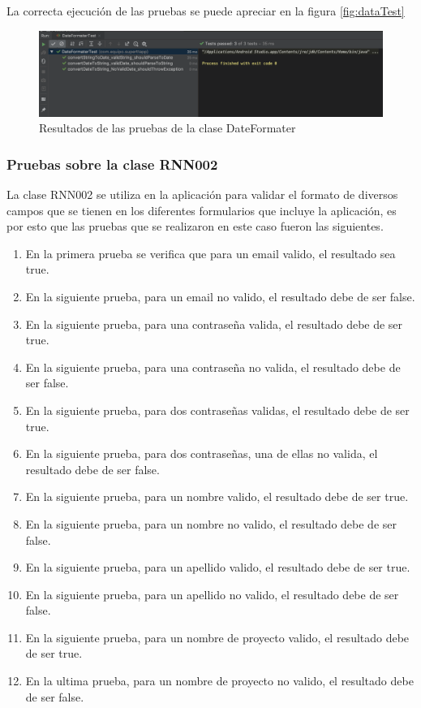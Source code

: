 La correcta ejecución de las pruebas se puede apreciar en la figura \ref{fig:dataTest}

\begin{figure}[h]
	\centering
	\includegraphics[width=450px]{capitulo6/unitarias/img/dateTest.png}
	\caption{Resultados de las pruebas de la clase DateFormater}
	\label{fig:dateTest}
\end{figure}

\subsubsection{Pruebas sobre la clase RNN002}
La clase RNN002 se utiliza en la aplicación para validar el formato de diversos campos que se tienen en los diferentes formularios que incluye la aplicación, es por esto que las pruebas que se realizaron en este caso fueron las siguientes.

\begin{enumerate}
	\item En la primera prueba se verifica que para un email valido, el resultado sea true.
	\item En la siguiente prueba, para un email no valido, el resultado debe de ser false.
	\item En la siguiente prueba, para una contraseña valida, el resultado debe de ser true.
	\item En la siguiente prueba, para una contraseña no valida, el resultado debe de ser false.
	\item En la siguiente prueba, para dos contraseñas validas, el resultado debe de ser true.
	\item En la siguiente prueba, para dos contraseñas, una de ellas no valida, el resultado debe de ser false.
	\item En la siguiente prueba, para un nombre valido, el resultado debe de ser true.
	\item En la siguiente prueba, para un nombre no valido, el resultado debe de ser false.
	\item En la siguiente prueba, para un apellido valido, el resultado debe de ser true.
	\item En la siguiente prueba, para un apellido no valido, el resultado debe de ser false.
	\item En la siguiente prueba, para un nombre de proyecto valido, el resultado debe de ser true.
	\item En la ultima prueba, para un nombre de proyecto no valido, el resultado debe de ser false.
\end{enumerate}

